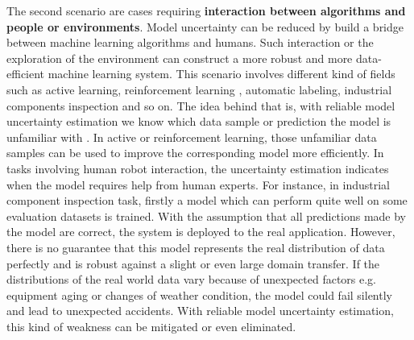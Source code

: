 The second scenario are cases requiring \textbf{interaction between algorithms and people or environments}. Model uncertainty can be reduced by build a bridge between machine learning algorithms and humans. Such interaction or the exploration of the environment can construct a more robust and more data-efficient machine learning system. This scenario involves different kind of fields such as active learning\cite{gal2017deep}, reinforcement learning\cite{blundell2015weight}\cite{osband2016deep}\cite{gal2016improving} %
, automatic labeling, industrial components inspection 
and so on. The idea behind that is, with reliable model uncertainty estimation we know which data sample or prediction the model is unfamiliar with 
. In active or reinforcement learning, those unfamiliar data samples can be used to improve the corresponding model more efficiently. In tasks involving human robot interaction, the uncertainty estimation indicates when the model requires help from human experts. For instance, in industrial component inspection task, firstly a model which can perform quite well on some evaluation datasets is trained. With the assumption that all predictions made by the model are correct, the system is deployed to the real application.
However, there is no guarantee that this model represents the real distribution of data perfectly and is robust against a slight or even large domain transfer. If the distributions of the real world data vary because of unexpected factors e.g. equipment aging or changes of weather condition, the model could fail silently and lead to unexpected accidents. With reliable model uncertainty estimation, this kind of weakness can be mitigated or even eliminated. 

